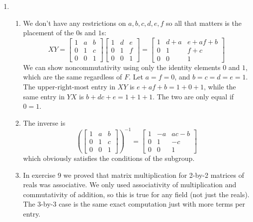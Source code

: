 \documentclass[]{article}
\begin{document}
\begin{enumerate}
\item
\begin{enumerate}
\item We don't have any restrictions on $a,b,c,d,e,f$ so all that matters is the placement of the $0$s and $1$s:
\begin{equation}
XY = \begin{bmatrix}1&a&b\\0&1&c\\0&0&1\end{bmatrix}\begin{bmatrix}1&d&e\\0&1&f\\0&0&1\end{bmatrix} = \begin{bmatrix}1&d+a&e+af+b\\0&1&f+c\\0&0&1\end{bmatrix} \label{eq:4.11a}
\end{equation}
We can show noncommutativity using only the identity elements $0$ and $1$, which are the same regardless of $F$. Let $a=f=0$, and $b=c=d=e=1$. The upper-right-most entry in $XY$ is $e+af+b = 1+0+1$, while the same entry in $YX$ is $b+dc+e = 1+1+1$. The two are only equal if $0=1$.

\item The inverse is
\begin{equation}
\left( \begin{bmatrix}1&a&b\\0&1&c\\0&0&1\end{bmatrix} \right)^{-1} = \begin{bmatrix}1&-a&ac-b\\0&1&-c\\0&0&1\end{bmatrix}
\end{equation}
which obviously satisfies the conditions of the subgroup.

\item In exercise 9 we proved that matrix multiplication for 2-by-2 matrices of reals was associative. We only used associativity of multiplication and commutativity of addition, so this is true for any field (not just the reals). The 3-by-3 case is the same exact computation just with more terms per entry.


\end{enumerate}
\end{enumerate}
\end{document}
